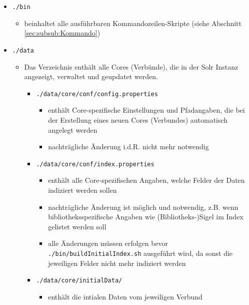 \documentclass[10pt]{article}
\begin{document}
\begin{itemize}
	\item[] \texttt{./bin}
	\begin{itemize}
		\item beinhaltet alle ausführbaren Kommandozeilen-Skripte (siehe Abschnitt \ref{sec:subsub:Kommando})
	\end{itemize}

	\item[] \texttt{./data}
	\begin{itemize}
		\item Das Verzeichnis enthält alle Cores (Verbünde), die in der Solr Instanz angezeigt, verwaltet und geupdatet werden.
		\begin{itemize}
			\item[] \texttt{./data/core/conf/config.properties}	
			\begin{itemize}
				\item enthält Core-spezifische Einstellungen und Pfadangaben, die bei der Erstellung eines neuen Cores (Verbundes) automatisch angelegt werden
				\item nachträgliche Änderung i.d.R. nicht mehr notwendig				
			\end{itemize}					
		\end{itemize}
		\begin{itemize}
			\item[] \texttt{./data/core/conf/index.properties}	
			\begin{itemize}
				\item enthält alle Core-spezifischen Angaben, welche Felder der Daten indiziert werden sollen
				\item nachträgliche Änderung ist möglich und notwendig, z.B. wenn bibliotheksspezifische Angaben wie (Bibliotheks-)Sigel im Index gelistet werden soll
				\item alle Änderungen müssen erfolgen bevor \texttt{./bin/buildInitialIndex.sh} ausgeführt wird, da sonst die jeweiligen Felder nicht mehr indiziert werden
			\end{itemize}					
		\end{itemize}
		\begin{itemize}
			\item[] \texttt{./data/core/initialData/}	
			\begin{itemize}
				\item enthält die intialen Daten vom jeweiligen Verbund
			\end{itemize}					
		\end{itemize}

\end{itemize}
\end{itemize}
\end{document}
